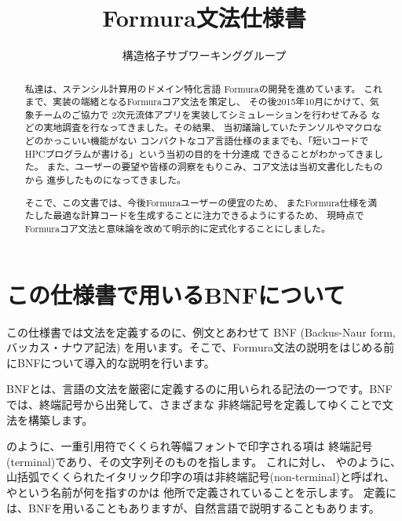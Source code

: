 \documentclass{jsarticle}
\def\<#1>{\synt{#1}}
\begin{document}
\title{Formura文法仕様書}

\author{構造格子サブワーキンググループ}

\maketitle


\begin{abstract}
  私達は、ステンシル計算用のドメイン特化言語
  Formura\citep{latticesubwg2015formura}の開発を進めています。
  これまで、実装の端緒となるFormuraコア文法を策定し、
  その後2015年10月にかけて、気象チームのご協力で
  2次元流体アプリを実装してシミュレーションを行わせてみる
  などの実地調査を行なってきました。その結果、
  当初議論していたテンソルやマクロなどのかっこいい機能がない
  コンパクトなコア言語仕様のままでも、「短いコードでHPCプログラムが書ける」という当初の目的を十分達成
  できることがわかってきました。
  また、ユーザーの要望や皆様の洞察をもりこみ、コア文法は当初文書化したものから
  進歩したものになってきました。

  そこで、この文書では、今後Formuraユーザーの便宜のため、
  またFormura仕様を満たした最適な計算コードを生成することに注力できるようにするため、
  現時点でFormuraコア文法と意味論を改めて明示的に定式化することにしました。

\end{abstract}


\newpage

\tableofcontents


\newpage


\section{この仕様書で用いるBNFについて}

この仕様書では文法を定義するのに、例文とあわせて
BNF (Backus-Naur form,バッカス・ナウア記法) を用います。そこで、Formura文法の説明をはじめる前にBNFについて導入的な説明を行います。


BNFとは、言語の文法を厳密に定義するのに用いられる記法の一つです。BNFでは、終端記号から出発して、さまざまな
非終端記号を定義してゆくことで文法を構築します。

のように、一重引用符でくくられ等幅フォントで印字される項は
終端記号(terminal)であり、その文字列そのものを指します。
これに対し、
\<a>や\<b>のように、山括弧でくくられたイタリック印字の項は非終端記号(non-terminal)と呼ばれ、
\<a>や\<b>という名前が何を指すのかは
他所で定義されていることを示します。
定義には、BNFを用いることもありますが、自然言語で説明することもあります。
\end{document}
